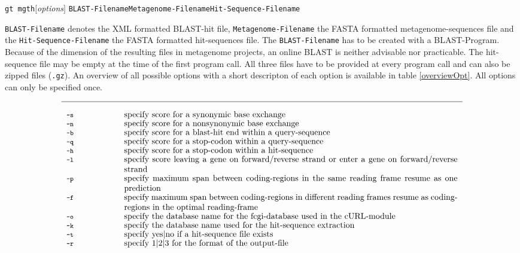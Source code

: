 \documentclass[12pt,titlepage]{article}
\newcommand{\MetagenomeThreader}{\textit{MetagenomeThreader}\xspace}
\newcommand{\XMLFile}{\texttt{\small{BLAST-Filename}}\xspace}
\newcommand{\MGFile}{\texttt{\small{Metagenome-Filename}}\xspace}
\newcommand{\HitFile}{\texttt{\small{Hit-Sequence-Filename}}\xspace}
\newcommand{\Gtmgth}{\texttt{gt mgth}\xspace}
\begin{document}
\Gtmgth $[$\emph{options}$]$ \XMLFile \MGFile \HitFile

\XMLFile denotes the XML formatted BLAST-hit file, \MGFile the FASTA formatted
metagenome-sequences file and the \HitFile the FASTA formatted hit-sequences file.
The \XMLFile has to be created with a BLAST-Program. Because of the dimension of the
resulting files in metagenome projects, an online BLAST is neither advisable nor practicable.
The hit-sequence file may be empty at the time of the first program call.
All three files have to be provided at every program call and can also be zipped files
(\texttt{\small{.gz}}).
An overview of all possible options with a short descripton of 
each option is available in table \ref{overviewOpt}.
All options can only be specified once.

\begin{table}[htbp]
\caption{Overview of the \MetagenomeThreader Options.}
\begin{footnotesize}
\[
\renewcommand{\arraystretch}{0.89}
\begin{tabular}{p{2cm}p{14cm}}\hline
\\
\Showoption{s}& specify score for a synonymic base exchange
\\
\Showoption{n}& specify score for a nonsynonymic base exchange
\\
\Showoption{b}& specify score for a blast-hit end within a query-sequence
\\
\Showoption{q}& specify score for a stop-codon within a query-sequence
\\
\Showoption{h}& specify score for a stop-codon within a hit-sequence
\\
\Showoption{l}& specify score leaving a gene on forward/reverse strand or enter a gene
on forward/reverse strand
\\
\Showoption{p}& specify maximum span between coding-regions in the same reading frame
resume as one prediction
\\
\Showoption{f}& specify maximum span between coding-regions in different reading
frames resume as coding-regions in the optimal reading-frame
\\
\Showoption{o}& specify the database name for the fcgi-database used in the cURL-module
\\
\Showoption{k}& specify the database name used for the hit-sequence extraction
\\
\Showoption{t}& specify yes$|$no if a hit-sequence file exists
\\
\Showoption{r}& specify 1$|$2$|$3 for the format of the output-file 

\end{tabular}\]
\end{footnotesize}
\end{table}
\end{document}
